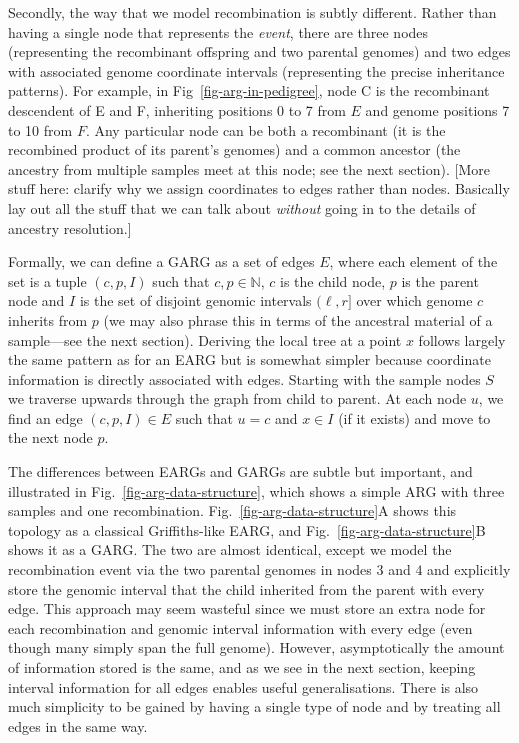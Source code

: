 \documentclass{article}
\begin{document}
Secondly, the way that we model recombination is subtly different.
Rather than having a single node that represents the \emph{event},
there are three nodes (representing the recombinant offspring and
two parental genomes) and two edges with associated genome coordinate
intervals (representing the precise inheritance patterns).
For example, in Fig~\ref{fig-arg-in-pedigree}, node \textsf{C} is the
recombinant descendent of \textsf{E} and \textsf{F}, inheriting positions
0 to 7 from $E$ and genome positions 7 to 10 from $F$. Any particular
node can be both a recombinant (it is the recombined product of
its parent's genomes) and a common ancestor (the ancestry from
multiple samples meet at this node; see the next section).
[More stuff here: clarify why we assign coordinates to edges
rather than nodes. Basically lay out all the stuff that we can
talk about \emph{without} going in to the details of
ancestry resolution.]


Formally, we can define a GARG as a set of edges $E$, where each
element of the set is a tuple $(c, p, I)$ such that $c, p \in \mathbb{N}$,
$c$ is the child node, $p$ is the parent node and $I$ is the set of
disjoint genomic intervals $(\ell, r]$ over which genome $c$ inherits from $p$ (we may
also phrase this in terms of the ancestral material of a sample---see
the next section). Deriving the local tree at a point $x$
follows largely the same pattern as for an EARG but is somewhat
simpler because coordinate information is directly associated with
edges. Starting with the sample nodes $S$ we traverse
upwards through the graph from child to parent. At each node $u$, we find an
edge $(c, p, I) \in E$ such that $u = c$ and $x \in I$ (if it
exists) and move to the next node $p$.

The differences between EARGs
and GARGs are subtle but important, and illustrated in
Fig.~\ref{fig-arg-data-structure}, which shows a simple ARG
with three samples and one recombination.
Fig.~\ref{fig-arg-data-structure}A shows this topology as a
classical Griffiths-like EARG, and
Fig.~\ref{fig-arg-data-structure}B shows it as a GARG.
The two are almost identical, except we model the recombination
event via the two parental genomes in nodes $3$ and $4$ and explicitly
store the genomic interval that the child inherited from the
parent with every edge.
This approach may seem wasteful since we must store an extra
node for each recombination and genomic interval information
with every edge (even though many simply span the full genome).
However, asymptotically the amount of information stored is the
same, and as we see in the next section, keeping interval
information for all edges enables useful generalisations.
There is also much simplicity to be gained by having
a single type of node and by treating all edges in the same way.
\end{document}
